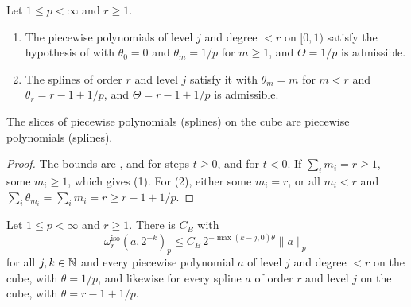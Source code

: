 \begin{lemma}
\label{lem:iso-exponents}
\leanok
{}
Let $1 \leq p < \infty$ and $r \geq 1$.
\begin{enumerate}
  \item The piecewise polynomials of level $j$ and degree $< r$ on $[0, 1)$ satisfy the hypothesis
    of  with $\theta_0 = 0$ and $\theta_m = 1/p$ for $m \geq 1$, and
    $\Theta = 1/p$ is admissible.
  \item The splines of order $r$ and level $j$ satisfy it with $\theta_m = m$ for $m < r$ and
    $\theta_r = r - 1 + 1/p$, and $\Theta = r - 1 + 1/p$ is admissible.
\end{enumerate}
The slices of piecewise polynomials (splines) on the cube are piecewise polynomials (splines).
\end{lemma}

\begin{proof}
\leanok
The bounds are ,  and 
for steps $t \geq 0$, and  for $t < 0$. If $\sum_i m_i = r \geq 1$, some
$m_i \geq 1$, which gives (1). For (2), either some $m_i = r$, or all $m_i < r$ and
$\sum_i \theta_{m_i} = \sum_i m_i = r \geq r - 1 + 1/p$.
\end{proof}

\begin{theorem}
\label{thm:iso-inverse}
\leanok
{}
Let $1 \leq p < \infty$ and $r \geq 1$. There is $C_B$ with
\[
  \omega^{\mathrm{iso}}_r(a, 2^{-k})_p \leq C_B \, 2^{-\max(k - j, 0)\theta} \|a\|_p
\]
for all $j, k \in \mathbb{N}$ and every piecewise polynomial $a$ of level $j$ and degree $< r$ on the cube,
with $\theta = 1/p$, and likewise for every spline $a$ of order $r$ and level $j$ on the cube, with
$\theta = r - 1 + 1/p$.
\end{theorem}

